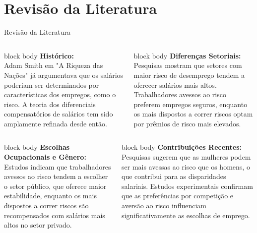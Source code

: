 \documentclass[aspectratio=169, xcolor={dvipsnames}, 10pt, brazil]{beamer}
\begin{document}
\section{Revisão da Literatura}
\begin{frame}{Revisão da Literatura}

    \begin{columns}
        \begin{beamercolorbox}[wd=\textwidth,rounded=true,shadow=true]{block body}
            \textbf{Histórico:} \\
            Adam Smith em "A Riqueza das Nações" já argumentava que os salários poderiam ser determinados por características dos empregos, como o risco. A teoria dos diferenciais compensatórios de salários tem sido amplamente refinada desde então.
        \end{beamercolorbox}
        
        \begin{beamercolorbox}[wd=\textwidth,rounded=true,shadow=true]{block body}
            \textbf{Diferenças Setoriais:} \\
            Pesquisas mostram que setores com maior risco de desemprego tendem a oferecer salários mais altos. Trabalhadores avessos ao risco preferem empregos seguros, enquanto os mais dispostos a correr riscos optam por prêmios de risco mais elevados.
        \end{beamercolorbox}
    \end{columns}

\vspace*{0.2cm}

    \begin{columns}
        \begin{beamercolorbox}[wd=\textwidth,rounded=true,shadow=true]{block body}
            \textbf{Escolhas Ocupacionais e Gênero:} \\
            Estudos indicam que trabalhadores avessos ao risco tendem a escolher o setor público, que oferece maior estabilidade, enquanto os mais dispostos a correr riscos são recompensados com salários mais altos no setor privado.
        \end{beamercolorbox}
        
        \begin{beamercolorbox}[wd=\textwidth,rounded=true,shadow=true]{block body}
            \textbf{Contribuições Recentes:} \\
            Pesquisas sugerem que as mulheres podem ser mais avessas ao risco que os homens, o que contribui para as disparidades salariais. Estudos experimentais confirmam que as preferências por competição e aversão ao risco influenciam significativamente as escolhas de emprego.
        \end{beamercolorbox}
    \end{columns}

\end{frame}
\end{document}
